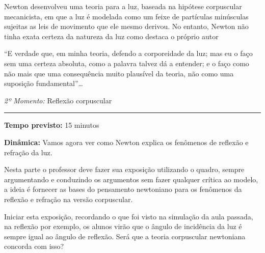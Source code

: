     Newton desenvolveu uma teoria para a luz, baseada na hipótese corpuscular mecanicista, em que a luz é modelada como um feixe de partículas minúsculas sujeitas as leis de movimento que ele mesmo derivou. No entanto, Newton não tinha exata certeza da natureza da luz como destaca o próprio autor
    
    \begin{citacao}
        ``E verdade que, em minha teoria, defendo a corporeidade da luz; mas eu o faço sem uma certeza absoluta, como a palavra talvez dá a entender; e o faço como não mais que uma consequência muito plausível da teoria, não como uma suposição fundamental''\dots \cite{FABIO:2009}
    \end{citacao}

    \vspace{50pt}
    \noindent \emph{2º Momento:} Reflexão corpuscular
	\par\noindent\rule{.3\textwidth}{.5pt}    
    \par\noindent \textbf{Tempo previsto: }15 minutos

    \noindent \textbf{Dinâmica:} Vamos agora ver como Newton explica os fenômenos de reflexão e refração da luz.

    Nesta parte o professor deve fazer sua exposição utilizando o quadro, sempre argumentando e conduzindo os argumentos sem fazer qualquer crítica ao modelo, a ideia é fornecer as bases do pensamento newtoniano para os fenômenos da reflexão e refração na versão corpuscular.

    Iniciar esta exposição, recordando o que foi visto na simulação da aula passada, na reflexão por exemplo, os alunos virão que o ângulo de incidência da luz é sempre igual ao ângulo de reflexão. Será que a teoria corpuscular newtoniana concorda com isso?

